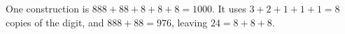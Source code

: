 One construction is $\boxed{888+88+8+8+8=1000}$. It uses $3+2+1+1+1=8$ copies of the digit, and $888+88=976$, leaving $24=8+8+8$.
